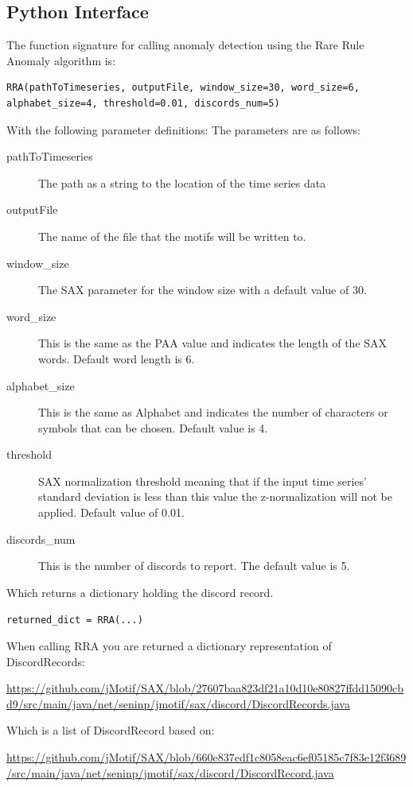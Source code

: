 \documentclass[titlepage, letterpaper, 12pt]{article}
\begin{document}
\subsection{Python Interface}
\label{pythonAnomaly}
The function signature for calling anomaly detection using the Rare Rule Anomaly algorithm is:
\begin{lstlisting}
RRA(pathToTimeseries, outputFile, window_size=30, word_size=6, alphabet_size=4, threshold=0.01, discords_num=5)
\end{lstlisting}

With the following parameter definitions:
The parameters are as follows:
\begin{description}
	\item[pathToTimeseries] The path as a string to the location of the time series data
	\item[outputFile] The name of the file that the motifs will be written to.
	\item[window\_size] The SAX parameter for the window size with a default value of 30.
	\item[word\_size] This is the same as the PAA value and indicates the length of the SAX words.  Default word length is 6.
	\item[alphabet\_size] This is the same as Alphabet and indicates the number of characters or symbols that can be chosen.  Default value is 4.
	
	\item[threshold] SAX normalization threshold meaning that if the input time series' standard deviation is less than this value the z-normalization will not be applied. Default value of 0.01.
	\item[discords\_num] This is the number of discords to report.  The default value is 5.
\end{description}
	
Which returns a dictionary holding the discord record.

\texttt{returned\_dict = RRA(...)}

When calling RRA you are returned a dictionary representation of DiscordRecords:

\url{https://github.com/jMotif/SAX/blob/27607baa823df21a10d10e80827ffdd15090cbd9/src/main/java/net/seninp/jmotif/sax/discord/DiscordRecords.java}

Which is a list of DiscordRecord based on:

\url{https://github.com/jMotif/SAX/blob/660e837edf1c8058eac6ef05185c7f83e12f3689/src/main/java/net/seninp/jmotif/sax/discord/DiscordRecord.java}
\end{document}
